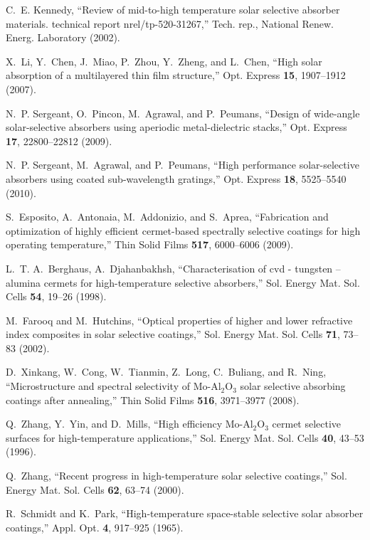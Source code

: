 \documentclass[10pt,letterpaper]{article}
\begin{document}
\begin{thebibliography}{100}
C.~E. Kennedy, \enquote{Review of mid-to-high temperature solar selective
  absorber materials. technical report nrel/tp-520-31267,} Tech. rep., National
  Renew. Energ. Laboratory (2002).

X.~Li, Y.~Chen, J.~Miao, P.~Zhou, Y.~Zheng, and L.~Chen, \enquote{High solar
  absorption of a multilayered thin film structure,} Opt. Express \textbf{15},
  1907--1912 (2007).

N.~P. Sergeant, O.~Pincon, M.~Agrawal, and P.~Peumans, \enquote{Design of
  wide-angle solar-selective absorbers using aperiodic metal-dielectric
  stacks,} Opt. Express \textbf{17}, 22800--22812 (2009).

N.~P. Sergeant, M.~Agrawal, and P.~Peumans, \enquote{High performance
  solar-selective absorbers using coated sub-wavelength gratings,} Opt. Express
  \textbf{18}, 5525--5540 (2010).

S.~Esposito, A.~Antonaia, M.~Addonizio, and S.~Aprea, \enquote{Fabrication and
  optimization of highly efficient cermet-based spectrally selective coatings
  for high operating temperature,} Thin Solid Films \textbf{517}, 6000--6006
  (2009).

L.~T. A.~Berghaus, A.~Djahanbakhsh, \enquote{Characterisation of cvd - tungsten
  – alumina cermets for high-temperature selective absorbers,} Sol. Energy
  Mat. Sol. Cells \textbf{54}, 19--26 (1998).

M.~Farooq and M.~Hutchins, \enquote{Optical properties of higher and lower
  refractive index composites in solar selective coatings,} Sol. Energy Mat.
  Sol. Cells \textbf{71}, 73--83 (2002).

D.~Xinkang, W.~Cong, W.~Tianmin, Z.~Long, C.~Buliang, and R.~Ning,
  \enquote{Microstructure and spectral selectivity of {M}o-{A}l$_2${O}$_3$
  solar selective absorbing coatings after annealing,} Thin Solid Films
  \textbf{516}, 3971--3977 (2008).

Q.~Zhang, Y.~Yin, and D.~Mills, \enquote{High efficiency {M}o-{A}l$_2${O}$_3$
  cermet selective surfaces for high-temperature applications,} Sol. Energy
  Mat. Sol. Cells \textbf{40}, 43--53 (1996).

Q.~Zhang, \enquote{Recent progress in high-temperature solar selective
  coatings,} Sol. Energy Mat. Sol. Cells \textbf{62}, 63--74 (2000).

R.~Schmidt and K.~Park, \enquote{High-temperature space-stable selective solar
  absorber coatings,} Appl. Opt. \textbf{4}, 917--925 (1965).


\end{thebibliography}
\end{document}

